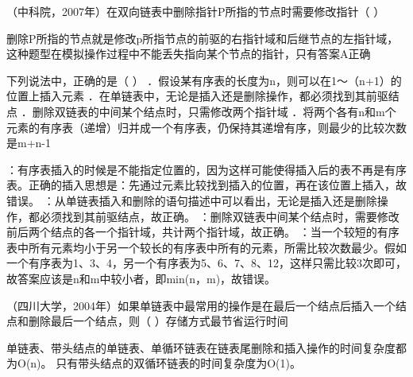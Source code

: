 \question （中科院，2007年）在双向链表中删除指针P所指的节点时需要修改指针（ ）
\par{}
\begin{solution}删除P所指的节点就是修改p所指节点的前驱的右指针域和后继节点的左指针域，这种题型在模拟操作过程中不能丢失指向某个节点的指针，只有答案A正确
\end{solution}
\question 下列说法中，正确的是（ ）
．假设某有序表的长度为n，则可以在1～（n+1）的位置上插入元素
．在单链表中，无论是插入还是删除操作，都必须找到其前驱结点
．删除双链表的中间某个结点时，只需修改两个指针域
．将两个各有n和m个元素的有序表（递增）归并成一个有序表，仍保持其递增有序，则最少的比较次数是m+n-1
\par{}
\begin{solution}：有序表插入的时候是不能指定位置的，因为这样可能使得插入后的表不再是有序表。正确的插入思想是：先通过元素比较找到插入的位置，再在该位置上插入，故错误。
：从单链表插入和删除的语句描述中可以看出，无论是插入还是删除操作，都必须找到其前驱结点，故正确。
：删除双链表中间某个结点时，需要修改前后两个结点的各一个指针域，共计两个指针域，故正确。
：当一个较短的有序表中所有元素均小于另一个较长的有序表中所有的元素，所需比较次数最少。假如一个有序表为1、3、4，另一个有序表为5、6、7、8、12，这样只需比较3次即可，故答案应该是n和m中较小者，即min(n，m)，故错误。
\end{solution}
\question （四川大学，2004年）如果单链表中最常用的操作是在最后一个结点后插入一个结点和删除最后一个结点，则（
）存储方式最节省运行时间
\par{}
\begin{solution}单链表、带头结点的单链表、单循环链表在链表尾删除和插入操作的时间复杂度都为O(n)。
只有带头结点的双循环链表的时间复杂度为O(1)。
\end{solution}
